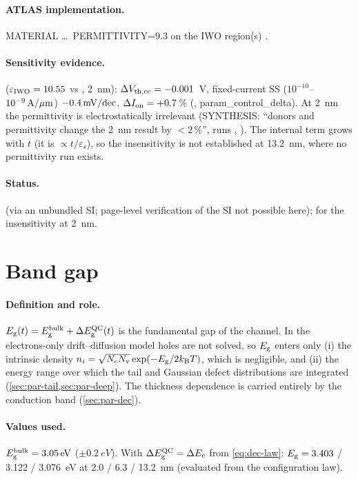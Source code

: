 \paragraph{ATLAS implementation.}
MATERIAL \ldots\ PERMITTIVITY=9.3 on the IWO region(s) \citep[p.~1340]{AtlasManual}.

\paragraph{Sensitivity evidence.}
 ($\varepsilon_{\mathrm{IWO}} = 10.55$ vs , 2~nm): $\Delta V_{\mathrm{th,cc}} = -0.001$~V, fixed-current SS
($10^{-10}$--$10^{-9}\,\mathrm{A}/\mu\mathrm{m}$) $-0.4\,\mathrm{mV/dec}$, $\Delta I_{\mathrm{on}} = +0.7$\,\% (, param\_control\_delta).
At 2~nm the permittivity is electrostatically irrelevant (SYNTHESIS: ``donors and permittivity change the 2~nm
result by $<2$\,\%'', runs , ). The internal term grows with $t$ (it is $\propto t/\varepsilon_s$),
so the insensitivity is not established at 13.2~nm, where no permittivity run exists.

\paragraph{Status.}
 (via an unbundled SI; page-level verification of the SI not possible here);
\evNUM{} for the insensitivity at 2~nm.

\section{Band gap}
\label{sec:par-eg}

\paragraph{Definition and role.}
$E_{\mathrm{g}}(t) = E_{\mathrm{g}}^{\mathrm{bulk}} + \Delta E_{\mathrm{g}}^{\mathrm{QC}}(t)$ is the fundamental gap of the channel. In the electrons-only
drift--diffusion model holes are not solved, so $E_{\mathrm{g}}$ enters only (i) the intrinsic density
$n_i = \sqrt{N_{\mathrm{c}}N_{\mathrm{v}}}\exp(-E_{\mathrm{g}}/2k_{\mathrm{B}}T)$, which is negligible, and (ii) the energy range over which the tail and
Gaussian defect distributions are integrated (\cref{sec:par-tail,sec:par-deep}). The thickness dependence is
carried entirely by the conduction band (\cref{sec:par-dec}).

\paragraph{Values used.}
$E_{\mathrm{g}}^{\mathrm{bulk}} = \SI{3.05}{eV}$ ($\pm\SI{0.2}{eV}$). With $\Delta E_{\mathrm{g}}^{\mathrm{QC}} = \Delta E_{\mathrm{c}}$ from \cref{eq:dec-law}:
$E_{\mathrm{g}} = 3.403$ / 3.122 / 3.076~eV at 2.0 / 6.3 / 13.2~nm (evaluated from the configuration law).

